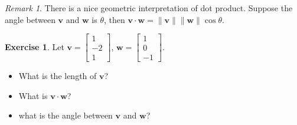 \documentclass{beamer}
\theoremstyle{definition}
\newtheorem{exercise}[theorem]{Exercise}
\theoremstyle{remark}
\newtheorem*{remark}{Remark}
\begin{document}
\begin{frame}[t]
\begin{remark}
There is a nice geometric interpretation of dot product. Suppose the angle between $\mathbf v$ and $\mathbf w$ is $\theta$, then $\mathbf v\cdot\mathbf w=\|\mathbf v\|\|\mathbf w\|\cos\theta$.
\begin{center}
\end{center}
\end{remark}
\pause
\begin{exercise}
Let $\mathbf v=\begin{bmatrix}
1\\-2\\1
\end{bmatrix}$, $\mathbf w=\begin{bmatrix}
1\\0\\-1
\end{bmatrix}$.
\begin{itemize}
\item What is the length of $\mathbf v$?
\item What is $\mathbf v\cdot\mathbf w$?
\item what is the angle between $\mathbf v$ and $\mathbf w$?
\end{itemize}
\end{exercise}
\end{frame}
\end{document}
